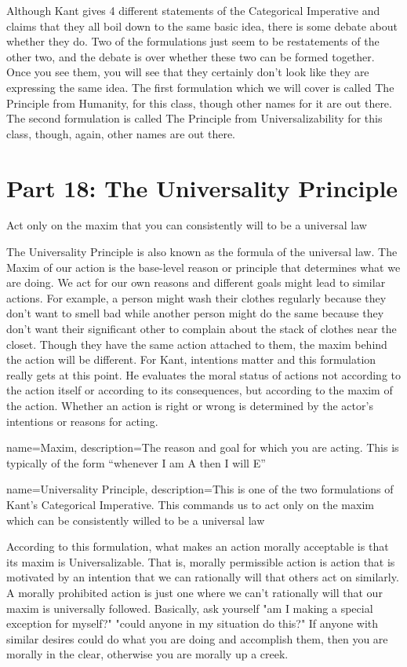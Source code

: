Although Kant gives 4 different statements of the Categorical Imperative and claims that they all boil down to the same basic idea, there is some debate about whether they do. Two of the formulations just seem to be restatements of the other two, and the debate is over whether these two can be formed together. Once you see them, you will see that they certainly don't look like they are expressing the same idea. The first formulation which we will cover is called The Principle from Humanity, for this class, though other names for it are out there. The second formulation is called The Principle from Universalizability for this class, though, again, other names are out there.

\chapter{Part 18: The Universality Principle}
\begin{center}
Act only on the maxim that you can consistently will to be a universal law
\end{center}
The \gls{Universality Principle} is also known as the formula of the universal law. The \Gls{Maxim} of our action is the base-level reason or principle that determines what we are doing. We act for our own reasons and different goals might lead to similar actions. For example, a person might wash their clothes regularly because they don't want to smell bad while another person might do the same because they don't want their significant other to complain about the stack of clothes near the closet. Though they have the same action attached to them, the maxim behind the action will be different.  For Kant, intentions matter and this formulation really gets at this point. He evaluates the moral status of actions not according to the action itself or according to its consequences, but according to the maxim of the action. Whether an action is right or wrong  is determined by the actor’s intentions or reasons for acting.

{
  name=Maxim,
  description={The reason and goal for which you are acting. This is typically of the form ``whenever I am A then I will E''}
}


{
  name=Universality Principle,
  description={This is one of the two formulations of Kant's Categorical Imperative. This commands us to act only on the maxim which can be consistently willed to be a universal law}
}


According to this formulation, what makes an action morally acceptable is that its maxim is \Gls{Universalizable}. That is, morally permissible action is action that is motivated by an intention that we can rationally will that others act on similarly. A morally prohibited action is just one where we can’t rationally will that our maxim is universally followed. Basically, ask yourself "am I making a special exception for myself?" "could anyone in my situation do this?" If anyone with similar desires could do what you are doing and accomplish them, then you are morally in the clear, otherwise you are morally up a creek.

